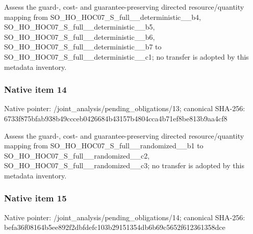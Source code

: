 \documentclass[10pt,a4paper]{article}
\begin{document}
\begingroup\raggedright\sloppy Assess the guard-,\allowbreak{} cost- and guarantee-preserving directed resource/\allowbreak{}quantity mapping from SO\_\allowbreak{}HO\_\allowbreak{}HOC07\_\allowbreak{}S\_\allowbreak{}full\_\allowbreak{}\_\allowbreak{}deterministic\_\allowbreak{}\_\allowbreak{}b4,\allowbreak{} SO\_\allowbreak{}HO\_\allowbreak{}HOC07\_\allowbreak{}S\_\allowbreak{}full\_\allowbreak{}\_\allowbreak{}deterministic\_\allowbreak{}\_\allowbreak{}b5,\allowbreak{} SO\_\allowbreak{}HO\_\allowbreak{}HOC07\_\allowbreak{}S\_\allowbreak{}full\_\allowbreak{}\_\allowbreak{}deterministic\_\allowbreak{}\_\allowbreak{}b6,\allowbreak{} SO\_\allowbreak{}HO\_\allowbreak{}HOC07\_\allowbreak{}S\_\allowbreak{}full\_\allowbreak{}\_\allowbreak{}deterministic\_\allowbreak{}\_\allowbreak{}b7 to SO\_\allowbreak{}HO\_\allowbreak{}HOC07\_\allowbreak{}S\_\allowbreak{}full\_\allowbreak{}\_\allowbreak{}deterministic\_\allowbreak{}\_\allowbreak{}c1;\allowbreak{} no transfer is adopted by this metadata inventory.\par\endgroup

\subsubsection{Native item 14}
Native pointer: /joint\_\allowbreak{}analysis/pending\_\allowbreak{}obligations/13; canonical SHA-256: 6733f875bfab938b49ccceb0426684b43157b4804cca4b71ef8be813b9aa4cf8

\begingroup\raggedright\sloppy Assess the guard-,\allowbreak{} cost- and guarantee-preserving directed resource/\allowbreak{}quantity mapping from SO\_\allowbreak{}HO\_\allowbreak{}HOC07\_\allowbreak{}S\_\allowbreak{}full\_\allowbreak{}\_\allowbreak{}randomized\_\allowbreak{}\_\allowbreak{}b1 to SO\_\allowbreak{}HO\_\allowbreak{}HOC07\_\allowbreak{}S\_\allowbreak{}full\_\allowbreak{}\_\allowbreak{}randomized\_\allowbreak{}\_\allowbreak{}c2,\allowbreak{} SO\_\allowbreak{}HO\_\allowbreak{}HOC07\_\allowbreak{}S\_\allowbreak{}full\_\allowbreak{}\_\allowbreak{}randomized\_\allowbreak{}\_\allowbreak{}c3;\allowbreak{} no transfer is adopted by this metadata inventory.\par\endgroup

\subsubsection{Native item 15}
Native pointer: /joint\_\allowbreak{}analysis/pending\_\allowbreak{}obligations/14; canonical SHA-256: befa36f08164b5ee892f2dbfdefc103b29151354db6b69c5652f612361358dce
\end{document}
